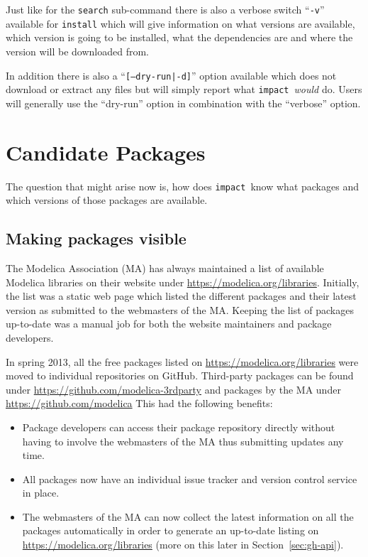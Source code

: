 \documentclass[11pt,a4paper,twocolumn]{article}
\newcommand{\impact}{\texttt{impact}} %
\newcommand{\code}[1]{\texttt{#1}} %
\begin{document}
Just like for the \code{search} sub-command there is also a verbose
switch ``\code{-v}'' available for \code{install} which will give
information on what versions are available, which version is going to
be installed, what the dependencies are and where the version will be
downloaded from.

In addition there is also a ``\code{[--dry-run|-d]}'' option available
which does not download or extract any files but will simply report
what \impact\ \emph{would} do.  Users will generally use the
``dry-run'' option in combination with the ``verbose'' option.



\section{Candidate Packages}
\label{sec:candidates}

The question that might arise now is, how does \impact\ know what
packages and which versions of those packages are available.

\subsection{Making packages visible}
\label{sec:collection}
The Modelica Association (MA) has always maintained a list of
available Modelica libraries on their website under
\url{https://modelica.org/libraries}.  Initially, the list was a
static web page which listed the different packages and their latest
version as submitted to the webmasters of the MA.  Keeping the list of
packages up-to-date was a manual job for both the website maintainers
and package developers.

In spring 2013, all the free packages listed on
\url{https://modelica.org/libraries} were moved to individual
repositories on GitHub. Third-party packages can be found under
\url{https://github.com/modelica-3rdparty} and packages by the MA
under \url{https://github.com/modelica} This had the following
benefits:
\begin{itemize}
\item Package developers can access their package repository directly without
having to involve the webmasters of the MA thus submitting updates any time.
\item All packages now have an individual issue tracker and version control
service in place.
\item The webmasters of the MA can now collect the latest information on all
the packages automatically in order to generate an up-to-date listing on
\url{https://modelica.org/libraries} (more on this later in
Section~\ref{sec:gh-api}).
\end{itemize}
\end{document}
